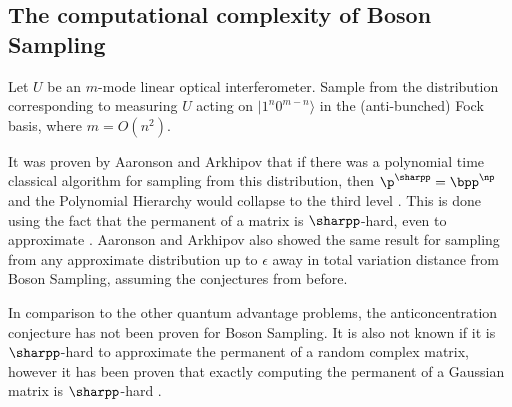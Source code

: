 \subsection{The computational complexity of Boson Sampling}
\label{ssec:cc-bs}

\begin{problem} Let $U$ be an $m$-mode linear optical interferometer. Sample from the distribution corresponding to measuring $U$ acting on $|1^n0^{m-n}\rangle$ in the (anti-bunched) Fock basis, where $m=O(n^2)$.
\end{problem}

It was proven by Aaronson and Arkhipov that if there was a polynomial time classical algorithm for sampling from this distribution, then $\p^{\sharpp} = \bpp^{\np}$ and the Polynomial Hierarchy would collapse to the third level \cite{aaronson2010report, aaronson2011}. This is done using the fact that the permanent of a matrix is $\sharpp$-hard, even to approximate \cite{valiant1979, aaronson2011sharpp}. 
Aaronson and Arkhipov also showed the same result for sampling from any approximate distribution up to $\epsilon$ away in total variation distance from Boson Sampling, assuming the conjectures from before.

In comparison to the other quantum advantage problems, the anticoncentration conjecture has not been proven for Boson Sampling. It is also not known if it is $\sharpp$-hard to approximate the permanent of a random complex matrix, however it has been proven that exactly computing the permanent of a Gaussian matrix is $\sharpp$-hard \cite{aaronson2010report, aaronson2011}.

